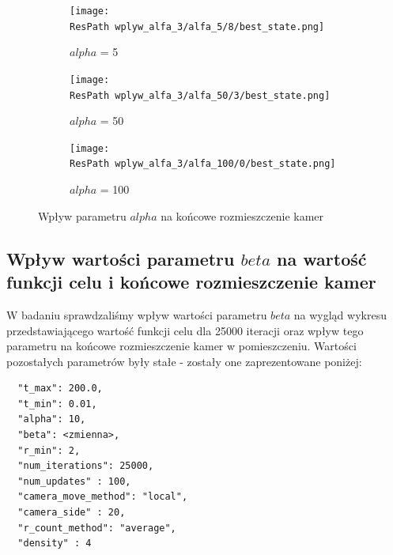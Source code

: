 \documentclass[12pt,a4paper]{article}
\newcommand{\ResPath}{../badania/}
\begin{document}
\begin{figure}[htb]
  \begin{subfigure}[b]{0.5\linewidth}
    \centering
    \texttt{[image: \\ResPath wplyw\_alfa\_3/alfa\_5/8/best\_state.png]}
    \caption{$alpha$ = 5}
    \label{fig_alfa_best_state:a}
    \vspace{2ex}
  \end{subfigure}%
  \begin{subfigure}[b]{0.5\linewidth}
    \texttt{[image: \\ResPath wplyw\_alfa\_3/alfa\_50/3/best\_state.png]}
    \caption{$alpha$ = 50}
    \label{fig_alfa_best_state:b}
    \vspace{2ex}
  \end{subfigure}
  \begin{subfigure}[b]{0.5\linewidth}
    \centering
    \texttt{[image: \\ResPath wplyw\_alfa\_3/alfa\_100/0/best\_state.png]}
    \caption{$alpha$ = 100}
    \label{fig_alfa_best_state:c}
  \end{subfigure}%

  \caption{Wpływ parametru $alpha$ na końcowe rozmieszczenie kamer}
  \label{fig_alfa_best_state}
\end{figure}
\restoregeometry

\subsection{Wpływ wartości parametru $beta$ na wartość funkcji celu i końcowe
rozmieszczenie kamer}
W badaniu sprawdzaliśmy wpływ wartości parametru $beta$ na wygląd wykresu
przedstawiającego wartość funkcji celu dla 25000 iteracji oraz wpływ tego
parametru na końcowe rozmieszczenie kamer w pomieszczeniu. Wartości pozostałych
parametrów były stałe - zostały one zaprezentowane poniżej:

\begin{lstlisting}
  "t_max": 200.0,
  "t_min": 0.01,
  "alpha": 10,
  "beta": <zmienna>,
  "r_min": 2,
  "num_iterations": 25000,
  "num_updates" : 100,
  "camera_move_method": "local",
  "camera_side" : 20,
  "r_count_method": "average",
  "density" : 4
\end{lstlisting}
\end{document}
